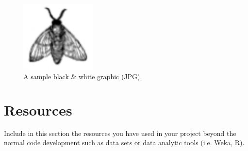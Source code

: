 \documentclass[12pt]{article}
\begin{document}
\begin{figure}[htb]
\begin{center}
\includegraphics[width=1.5in]{images/fly.jpg}
\caption{A sample black \& white graphic (JPG).}
\label{SAMPLE FIGURE}
\end{center}
\end{figure}

\section{Resources}
Include in this section the resources you have used in your project beyond the normal code development such as data sets or data analytic tools (i.e. Weka, R).
\end{document}
